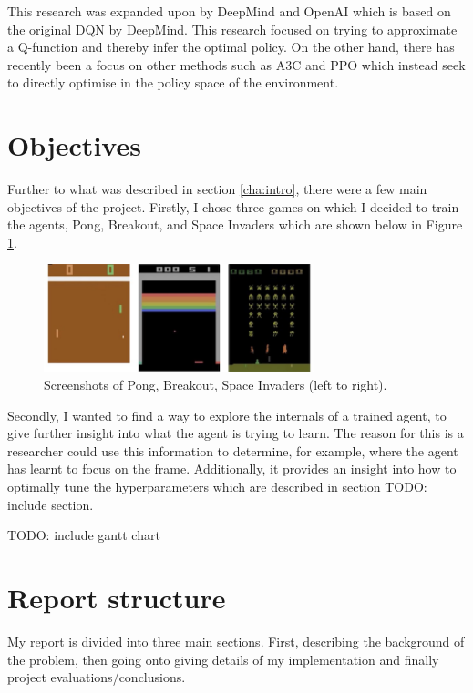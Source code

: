 This research was expanded upon by DeepMind and OpenAI which is based on the original DQN by DeepMind. This research focused on trying to approximate a Q-function and thereby infer the optimal policy. On the other hand, there has recently been a focus on other methods such as A3C and PPO which instead seek to directly optimise in the policy space of the environment.

\section{Objectives}
\label{intro:sec:obj}
Further to what was described in section \ref{cha:intro}, there were a few main objectives of the project. Firstly, I chose three games on which I decided to train the agents, Pong, Breakout, and Space Invaders which are shown below in Figure \ref{fig:atari-screenshot}.

\begin{figure}[htbp]
	\centering
	\includegraphics[width=0.7\textwidth]{chapters/chapter1/images/atari-combined.jpg}
	\caption{Screenshots of Pong, Breakout, Space Invaders (left to right).
		\label{fig:atari-screenshot}
	}
\end{figure}


Secondly, I wanted to find a way to explore the internals of a trained agent, to give further insight into what the agent is trying to learn. The reason for this is a researcher could use this information to determine, for example, where the agent has learnt to focus on the frame. Additionally, it provides an insight into how to optimally tune the hyperparameters which are described in section TODO: include section.

TODO: include gantt chart

\section{Report structure}
\label{intro:sec:report_struc}

My report is divided into three main sections. First, describing the background of the problem, then going onto giving details of my implementation and finally project evaluations/conclusions.